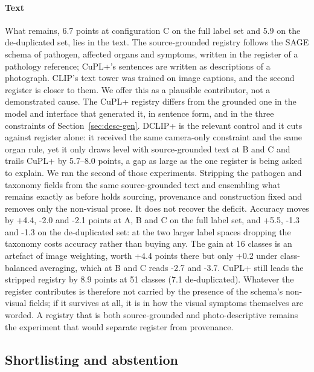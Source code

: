 \documentclass[a4paper,fleqn]{cas-dc}
\begin{document}
\paragraph{Text} What remains, 6.7 points at configuration C on the full label set and 5.9 on the
de-duplicated set, lies in the text. The source-grounded registry follows the SAGE schema of pathogen,
affected organs and symptoms, written in the register of a pathology reference; CuPL+'s sentences are
written as descriptions of a photograph. CLIP's text tower was trained on image captions, and the
second register is closer to them. We offer this as a plausible contributor, not a demonstrated
cause. The CuPL+ registry differs from the grounded one in the model and interface that generated
it, in sentence form, and in the three constraints of Section~\ref{sec:desc-gen}. DCLIP+ is the
relevant control and it cuts against register alone: it received the same camera-only constraint and
the same organ rule, yet it only draws level with source-grounded text at B and C and trails CuPL+
by 5.7--8.0 points, a gap as large as the one register is being asked to explain. We ran the second of those experiments. Stripping the pathogen and taxonomy fields from the same
source-grounded text and ensembling what remains exactly as before holds sourcing, provenance and
construction fixed and removes only the non-visual prose. It does not recover the deficit.
Accuracy moves by +4.4, -2.0 and -2.1 points at A, B and C on the full label set, and +5.5, -1.3
and -1.3 on the de-duplicated set: at the two larger label spaces dropping the taxonomy costs
accuracy rather than buying any. The gain at 16 classes is an artefact of image weighting, worth
+4.4 points there but only +0.2 under class-balanced averaging, which at B and C reads -2.7 and
-3.7. CuPL+ still leads the stripped registry by 8.9 points at 51 classes (7.1 de-duplicated).
Whatever the register contributes is therefore not carried by the presence of the schema's
non-visual fields; if it survives at all, it is in how the visual symptoms themselves are worded.
A registry that is both source-grounded and photo-descriptive remains the experiment that would
separate register from provenance.

\subsection{Shortlisting and abstention}
\label{sec:abstain}
\end{document}
